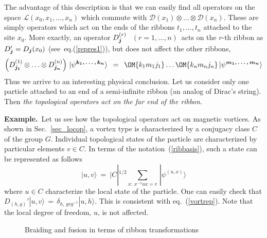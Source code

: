 \documentclass[12pt]{article}
\newcommand*{\epsfscale}[1]{\def\epsfsize##1##2{#1##1}}
\newcommand*{\boldind}[1]{{\mbox{\scriptsize\boldmath$#1$}}}
\newcommand*{\RD}[1]{D_\boldind{#1}}
\newcommand*{\PSI}[1]{|\psi^\boldind{#1}\rangle}
\newcommand{\calD}{\mathcal{D}}
\newcommand{\calL}{\mathcal{L}}
\begin{document}
The advantage of this description is that we can easily find all operators on
the space $\calL(x_0,x_1,\ldots,x_n)$ which commute with
$\calD(x_1)\otimes\ldots\otimes\calD(x_n)$. These are simply operators which
act on the ends of the ribbons $t_1,\ldots,t_n$ attached to the site $x_0$.
More exactly, an operator $\RD{j}^{(r)}$\,\, $(r=1,\ldots,n)$\, acts on the
$r$-th ribbon as $\RD{j}'=\RD{j}(x_0)$ (see~eq.(\ref{repres1})), but does not
affect the other ribbons,
\begin{equation} \label{topop}
  \Bigl(\RD{j_1}^{(1)}\otimes\ldots\otimes\RD{j_n}^{(n)}\Bigr)\ 
  \PSI{k_1,\ldots,k_{n}}\,\ =\,\ 
  \OM{{k_1}{m_1}{j_1}}\ldots\OM{{k_n}{m_n}{j_n}}\,\PSI{m_1,\ldots,m_{n}}
\end{equation}
Thus we arrive to an interesting physical conclusion. Let us consider only one
particle attached to an end of a semi-infinite ribbon (an analog of Dirac's
string). Then \emph{the topological operators act on the far end of the
ribbon}.
\smallskip

\noindent\textbf{Example.}\, Let us see how the topological operators act on
magnetic vortices. As shown in Sec.~\ref{sec_locop}, a vortex type is
characterized by a conjugacy class $C$ of the group $G$. Individual
topological states of the particle are characterized by particular elements
$v\in C$. In terms of the notation~(\ref{ribbasis}), such a state can be
represented as follows
\[
  |u,v\rangle\ =\ |C|^{1/2} \sum_{x:\ x^{-1}ux=v}\, |\psi^{(u,x)}\rangle
\]
where $u\in C$ characterize the local state of the particle. One can easily
check that $D_{(h,g)}'|u,v\rangle\,=\,\delta_{h,\,gvg^{-1}}|u,h\rangle$. This
is consistent with eq.~(\ref{vortrep}). Note that the local degree of freedom,
$u$, is not affected.

\begin{figure}[t]
\centerline{\epsfscale{0.6}}
\caption{Braiding and fusion in terms of ribbon transformations}
\label{fig_braidfus}
\end{figure}
\end{document}
